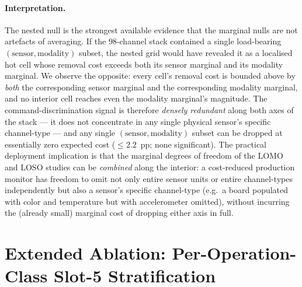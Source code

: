 \documentclass[11pt,a4paper]{article}
\begin{document}
\paragraph{Interpretation.} The nested null is the strongest available evidence that the marginal nulls are not artefacts of averaging. If the $98$-channel stack contained a single load-bearing $(\text{sensor},\text{modality})$ subset, the nested grid would have revealed it as a localised hot cell whose removal cost exceeds both its sensor marginal and its modality marginal. We observe the opposite: every cell's removal cost is bounded above by \emph{both} the corresponding sensor marginal and the corresponding modality marginal, and no interior cell reaches even the modality marginal's magnitude. The command-discrimination signal is therefore \emph{densely redundant} along both axes of the stack --- it does not concentrate in any single physical sensor's specific channel-type --- and any single $(\text{sensor},\text{modality})$ subset can be dropped at essentially zero expected cost ($\le 2.2$~pp; none significant). The practical deployment implication is that the marginal degrees of freedom of the LOMO and LOSO studies can be \emph{combined} along the interior: a cost-reduced production monitor has freedom to omit not only entire sensor units or entire channel-types independently but also a sensor's specific channel-type (e.g.\ a board populated with color and temperature but with accelerometer omitted), without incurring the (already small) marginal cost of dropping either axis in full.

\section{Extended Ablation: Per-Operation-Class Slot-5 Stratification}
\label{app:source-entropy}
\end{document}

